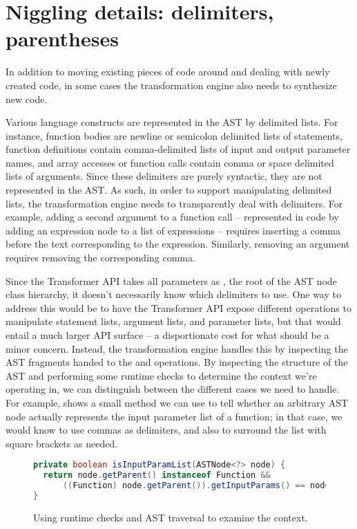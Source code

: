 \section{Niggling details: delimiters, parentheses}

In addition to moving existing pieces of code around and dealing with newly
created code, in some cases the transformation engine also needs to synthesize
new code.

Various \matlab language constructs are represented in the AST by delimited
lists. For instance, function bodies are newline or semicolon delimited lists
of statements, function definitions contain comma-delimited lists of input and
output parameter names, and array accesses or function calls contain comma or
space delimited lists of arguments. Since these delimiters are purely
syntactic, they are not represented in the AST. As such, in order to support
manipulating delimited lists, the transformation engine needs to transparently
deal with delimiters. For example, adding a second argument to a function call
-- represented in code by adding an expression node to a list of expressions --
requires inserting a comma before the text corresponding to the expression.
Similarly, removing an argument requires removing the corresponding comma.

Since the Transformer API takes all parameters as , the root
of the AST node class hierarchy, it doesn't necessarily know which delimiters
to use. One way to address this would be to have the Transformer API expose
different operations to manipulate statement lists, argument lists, and
parameter lists, but that would entail a much larger API surface -- a
disportionate cost for what should be a minor concern. Instead, the
transformation engine handles this by inspecting the AST fragments handed to
the  and  operations. By inspecting the structure
of the AST and performing some runtime checks to determine the context we're
operating in, we can distinguish between the different cases we need to handle.
For example,  shows a small method we can use to tell
whether an arbitrary AST node actually represents the input parameter list of a
function; in that case, we would know to use commas as delimiters, and also to
surround the list with square brackets as needed.

\begin{figure}
\begin{lstlisting}[language=Java, numbers=none]
private boolean isInputParamList(ASTNode<?> node) {
  return node.getParent() instanceof Function &&
      ((Function) node.getParent()).getInputParams() == node;
}
\end{lstlisting}
\caption{Using runtime checks and AST traversal to examine the context.}
\label{Fig:WhereAreWe}
\end{figure}

